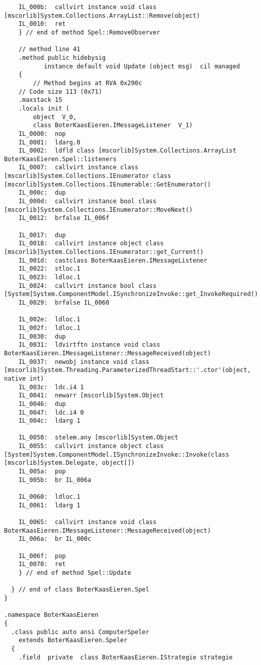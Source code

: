\begin{lstlisting}
	IL_000b:  callvirt instance void class [mscorlib]System.Collections.ArrayList::Remove(object)
	IL_0010:  ret 
    } // end of method Spel::RemoveObserver

    // method line 41
    .method public hidebysig 
           instance default void Update (object msg)  cil managed 
    {
        // Method begins at RVA 0x290c
	// Code size 113 (0x71)
	.maxstack 15
	.locals init (
		object	V_0,
		class BoterKaasEieren.IMessageListener	V_1)
	IL_0000:  nop 
	IL_0001:  ldarg.0 
	IL_0002:  ldfld class [mscorlib]System.Collections.ArrayList BoterKaasEieren.Spel::listeners
	IL_0007:  callvirt instance class [mscorlib]System.Collections.IEnumerator class [mscorlib]System.Collections.IEnumerable::GetEnumerator()
	IL_000c:  dup 
	IL_000d:  callvirt instance bool class [mscorlib]System.Collections.IEnumerator::MoveNext()
	IL_0012:  brfalse IL_006f

	IL_0017:  dup 
	IL_0018:  callvirt instance object class [mscorlib]System.Collections.IEnumerator::get_Current()
	IL_001d:  castclass BoterKaasEieren.IMessageListener
	IL_0022:  stloc.1 
	IL_0023:  ldloc.1 
	IL_0024:  callvirt instance bool class [System]System.ComponentModel.ISynchronizeInvoke::get_InvokeRequired()
	IL_0029:  brfalse IL_0060

	IL_002e:  ldloc.1 
	IL_002f:  ldloc.1 
	IL_0030:  dup 
	IL_0031:  ldvirtftn instance void class BoterKaasEieren.IMessageListener::MessageReceived(object)
	IL_0037:  newobj instance void class [mscorlib]System.Threading.ParameterizedThreadStart::'.ctor'(object, native int)
	IL_003c:  ldc.i4 1
	IL_0041:  newarr [mscorlib]System.Object
	IL_0046:  dup 
	IL_0047:  ldc.i4 0
	IL_004c:  ldarg 1

	IL_0050:  stelem.any [mscorlib]System.Object
	IL_0055:  callvirt instance object class [System]System.ComponentModel.ISynchronizeInvoke::Invoke(class [mscorlib]System.Delegate, object[])
	IL_005a:  pop 
	IL_005b:  br IL_006a

	IL_0060:  ldloc.1 
	IL_0061:  ldarg 1

	IL_0065:  callvirt instance void class BoterKaasEieren.IMessageListener::MessageReceived(object)
	IL_006a:  br IL_000c

	IL_006f:  pop 
	IL_0070:  ret 
    } // end of method Spel::Update

  } // end of class BoterKaasEieren.Spel
}

.namespace BoterKaasEieren
{
  .class public auto ansi ComputerSpeler
  	extends BoterKaasEieren.Speler
  {
    .field  private  class BoterKaasEieren.IStrategie strategie


\end{lstlisting}

